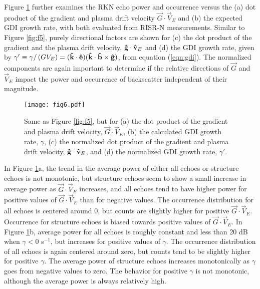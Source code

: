 Figure \ref{fig:f6} further examines the RKN echo power and occurrence versus the (a) dot product of the gradient and plasma drift velocity \(\vec{G}\cdot\vec{V}_E\) and (b) the expected GDI growth rate, with both evaluated from RISR-N measurements.  Similar to Figure \ref{fig:f5}, purely directional factors are shown for (c) the dot product of the gradient and the plasma drift velocity, \(\mathbf{\hat{g}}\cdot\mathbf{\hat{v}}_E\)  and (d) the GDI growth rate, given by \(\gamma^\prime \equiv \gamma/\left(GV_E\right) = (\mathbf{\hat{k}}\cdot\mathbf{\hat{e}})(\mathbf{\hat{k}}\cdot\mathbf{\hat{b}}\times\mathbf{\hat{g}})\), from equation (\ref{eqn:gdi}).  The normalized components are again important to determine if the relative directions of \(\vec{G}\) and \(\vec{V}_E\) impact the power and occurrence of backscatter independent of their magnitude.

\begin{figure}
	\texttt{[image: fig6.pdf]}
  \caption{Same as Figure \ref{fig:f5}, but for (a) the dot product of the gradient and plasma drift velocity, \(\vec{G}\cdot\vec{V}_E\), (b) the calculated GDI growth rate, \(\gamma\), (c) the normalized dot product of the  gradient and plasma drift velocity, \(\mathbf{\hat{g}}\cdot\mathbf{\hat{v}}_E\), and (d) the normalized GDI growth rate, \(\gamma'\).}
  \label{fig:f6}
\end{figure}

In Figure \ref{fig:f6}a, the trend in the average power of either all echoes or structure echoes is not monotonic, but structure echoes seem to show a small increase in average power as \(\vec{G}\cdot\vec{V}_E\) increases, and all echoes tend to have higher power for positive values of \(\vec{G}\cdot\vec{V}_E\) than for negative values. The occurrence distribution for all echoes is centered around 0, but counts are slightly higher for positive \(\vec{G}\cdot\vec{V}_E\).  Occurrence for structure echoes is biased towards positive values of \(\vec{G}\cdot\vec{V}_E\).  In Figure \ref{fig:f6}b, average power for all echoes is roughly constant and less than 20 dB when \(\gamma < 0\) s\(^{-1}\), but increases for positive values of \(\gamma\).  The occurrence distribution of all echoes is again centered around zero, but counts tend to be slightly higher for positive \(\gamma\).  The average power of structure echoes increases monotonically as \(\gamma\) goes from negative values to zero.  The behavior for positive \(\gamma\) is not monotonic, although the average power is always relatively high.

